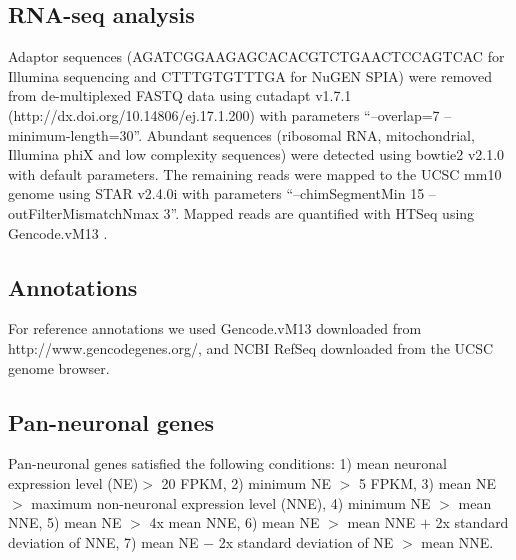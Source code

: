 \subsection{RNA-seq analysis}
Adaptor sequences (AGATCGGAAGAGCACACGTCTGAACTCCAGTCAC for Illumina sequencing and CTTTGTGTTTGA for NuGEN SPIA) were removed from de-multiplexed FASTQ data using cutadapt v1.7.1 (http://dx.doi.org/10.14806/ej.17.1.200) with parameters “--overlap=7 --minimum-length=30”. Abundant sequences (ribosomal RNA, mitochondrial, Illumina phiX and low complexity sequences) were detected using bowtie2 \citep{Langmead_2012} v2.1.0 with default parameters. The remaining reads were mapped to the UCSC mm10 genome using STAR \citep{Dobin_2012} v2.4.0i with parameters “--chimSegmentMin 15 --outFilterMismatchNmax 3”. Mapped reads are quantified with HTSeq \citep{Anders_2014} using Gencode.vM13 \citep{Harrow_2012}.

\subsection{Annotations}
For reference annotations we used Gencode.vM13 \citep{Harrow_2012} downloaded from http://www.gencodegenes.org/, and NCBI RefSeq \citep{Pruitt_2013} downloaded from the UCSC genome browser.

\subsection{Pan-neuronal genes}
Pan-neuronal genes satisfied the following conditions: 1) mean neuronal expression level (NE)$>$ 20 FPKM, 2) minimum NE $>$ 5 FPKM, 3) mean NE $>$ maximum non-neuronal expression level (NNE), 4) minimum NE $>$ mean NNE, 5) mean NE $>$ 4x mean NNE, 6) mean NE $>$ mean NNE $+$ 2x standard deviation of NNE, 7) mean NE $-$ 2x standard deviation of NE $>$ mean NNE. 

